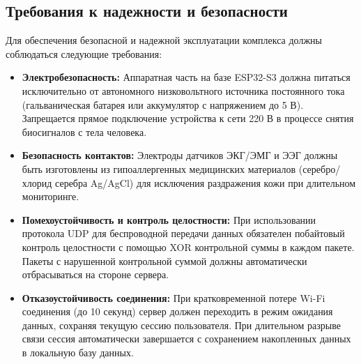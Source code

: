 \documentclass[utf8, russian]{eskdtext}
\begin{document}
\subsection{Требования к надежности и безопасности}
Для обеспечения безопасной и надежной эксплуатации комплекса должны соблюдаться следующие требования:
\begin{itemize}
    \item \textbf{Электробезопасность:} Аппаратная часть на базе ESP32-S3 должна питаться исключительно от автономного низковольтного источника постоянного тока (гальваническая батарея или аккумулятор с напряжением до 5 В). Запрещается прямое подключение устройства к сети 220 В в процессе снятия биосигналов с тела человека.
    \item \textbf{Безопасность контактов:} Электроды датчиков ЭКГ/ЭМГ и ЭЭГ должны быть изготовлены из гипоаллергенных медицинских материалов (серебро/хлорид серебра Ag/AgCl) для исключения раздражения кожи при длительном мониторинге.
    \item \textbf{Помехоустойчивость и контроль целостности:} При использовании протокола UDP для беспроводной передачи данных обязателен побайтовый контроль целостности с помощью XOR контрольной суммы в каждом пакете. Пакеты с нарушенной контрольной суммой должны автоматически отбрасываться на стороне сервера.
    \item \textbf{Отказоустойчивость соединения:} При кратковременной потере Wi-Fi соединения (до 10 секунд) сервер должен переходить в режим ожидания данных, сохраняя текущую сессию пользователя. При длительном разрыве связи сессия автоматически завершается с сохранением накопленных данных в локальную базу данных.
\end{itemize}
\end{document}
